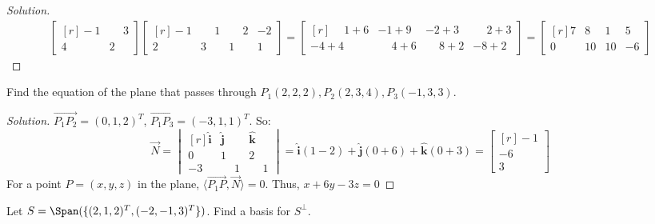 \documentclass[crop=false,class=book,oneside]{standalone}                      %
\begin{document}
        \begin{proof}[Solution]
        \begin{align*}
            \begin{bmatrix*}[r] -1 & \phantom{-}3 \\ 4 & 2 \end{bmatrix*} \begin{bmatrix*}[r] -1 & \phantom{-}1 & \phantom{-}2 & -2 \\ 2 & 3 & 1 & 1 \end{bmatrix*}=\begin{bmatrix*}[r] \phantom{-}1+6 & -1+9 & -2+3 & \phantom{-}2+3 \\ -4+4 & \phantom{-}4+6 & \phantom{-}8+2 & -8+2 \end{bmatrix*}=\begin{bmatrix*}[r] 7 & 8 & 1 & 5 \\ 0 & 10 & 10 & -6 \end{bmatrix*}
        \end{align*}
        \end{proof}
        \begin{problem}
        Find the equation of the plane that passes through $P_1(2,2,2), P_2(2,3,4), P_3(-1,3,3)$.
        \end{problem}
        \begin{proof}[Solution]
        $\overrightarrow{P_1P_2} = (0,1,2)^{T}$, $\overrightarrow{P_1 P_3} = (-3,1,1)^{T}$. So:
        \begin{equation*}
            \overrightarrow{N} = \begin{vmatrix*}[r] \hat{\mathbf{i}} & \hat{\mathbf{j}} & \hat{\mathbf{k}} \\ 0 & 1 & 2 \\ -3 & \phantom{-}1 & \phantom{-}1 \end{vmatrix*} = \hat{\mathbf{i}}(1-2) + \hat{\mathbf{j}}(0+6) + \hat{\mathbf{k}}(0+3)=\begin{bmatrix*}[r]-1 \\ -6 \\ 3\end{bmatrix*}   
        \end{equation*}
        For a point $P=(x,y,z)$ in the plane, $\langle \overrightarrow{P_1P}, \overrightarrow{N}\rangle = 0$. Thus, $x + 6y - 3z =0$
        \end{proof}
        \begin{problem}
        Let $S=\Span(\{(2,1,2)^T, (-2,-1,3)^T\})$. Find a basis for $S^{\perp}$.
        \end{problem}
\end{document}
